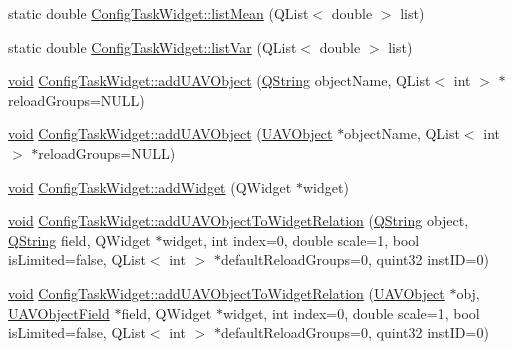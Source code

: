 \begin{DoxyCompactItemize}
static double \hyperlink{group___u_a_v_object_widget_utils_ga134c15f52a4eccf9aeb9bbacdc296b80}{\-Config\-Task\-Widget\-::list\-Mean} (\-Q\-List$<$ double $>$ list)
\item 
static double \hyperlink{group___u_a_v_object_widget_utils_ga2f33179993858ca636461e78e3a7a3c8}{\-Config\-Task\-Widget\-::list\-Var} (\-Q\-List$<$ double $>$ list)
\item 
\hyperlink{group___u_a_v_objects_plugin_ga444cf2ff3f0ecbe028adce838d373f5c}{void} \hyperlink{group___u_a_v_object_widget_utils_ga82f371b1291826ec74341dddfe827c83}{\-Config\-Task\-Widget\-::add\-U\-A\-V\-Object} (\hyperlink{group___u_a_v_objects_plugin_gab9d252f49c333c94a72f97ce3105a32d}{\-Q\-String} object\-Name, \-Q\-List$<$ int $>$ $\ast$reload\-Groups=\-N\-U\-L\-L)
\item 
\hyperlink{group___u_a_v_objects_plugin_ga444cf2ff3f0ecbe028adce838d373f5c}{void} \hyperlink{group___u_a_v_object_widget_utils_gac56e252ece21406583d59af2b70c2565}{\-Config\-Task\-Widget\-::add\-U\-A\-V\-Object} (\hyperlink{class_u_a_v_object}{\-U\-A\-V\-Object} $\ast$object\-Name, \-Q\-List$<$ int $>$ $\ast$reload\-Groups=\-N\-U\-L\-L)
\item 
\hyperlink{group___u_a_v_objects_plugin_ga444cf2ff3f0ecbe028adce838d373f5c}{void} \hyperlink{group___u_a_v_object_widget_utils_ga3edd7677e362be586b059c066e0a4e30}{\-Config\-Task\-Widget\-::add\-Widget} (\-Q\-Widget $\ast$widget)
\item 
\hyperlink{group___u_a_v_objects_plugin_ga444cf2ff3f0ecbe028adce838d373f5c}{void} \hyperlink{group___u_a_v_object_widget_utils_ga8f5d01ae74d161f7b85d123e66c49451}{\-Config\-Task\-Widget\-::add\-U\-A\-V\-Object\-To\-Widget\-Relation} (\hyperlink{group___u_a_v_objects_plugin_gab9d252f49c333c94a72f97ce3105a32d}{\-Q\-String} object, \hyperlink{group___u_a_v_objects_plugin_gab9d252f49c333c94a72f97ce3105a32d}{\-Q\-String} field, \-Q\-Widget $\ast$widget, int index=0, double scale=1, bool is\-Limited=false, \-Q\-List$<$ int $>$ $\ast$default\-Reload\-Groups=0, quint32 inst\-I\-D=0)
\item 
\hyperlink{group___u_a_v_objects_plugin_ga444cf2ff3f0ecbe028adce838d373f5c}{void} \hyperlink{group___u_a_v_object_widget_utils_ga9516761ea1de60250535bdebc9dd7fa9}{\-Config\-Task\-Widget\-::add\-U\-A\-V\-Object\-To\-Widget\-Relation} (\hyperlink{class_u_a_v_object}{\-U\-A\-V\-Object} $\ast$obj, \hyperlink{class_u_a_v_object_field}{\-U\-A\-V\-Object\-Field} $\ast$field, \-Q\-Widget $\ast$widget, int index=0, double scale=1, bool is\-Limited=false, \-Q\-List$<$ int $>$ $\ast$default\-Reload\-Groups=0, quint32 inst\-I\-D=0)

\end{DoxyCompactItemize}
